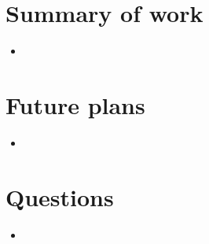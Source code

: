 \documentclass[10pt,final,a4paper,oneside,onecolumn]{article}
\begin{document}
\section{Summary of work}

\begin{itemize}
	\item 
\end{itemize}

\section{Future plans}

\begin{itemize}
	\item 
\end{itemize}

\section{Questions}

\begin{itemize}
	\item 
\end{itemize}



\end{document}
